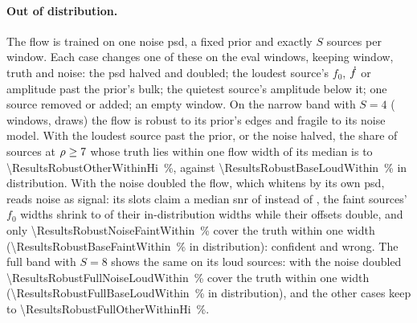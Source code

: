 \paragraph{Out of distribution.}
The flow is trained on one noise \ac{psd}, a fixed prior and exactly $S$ sources per window. Each case changes one of these
on the eval windows, keeping window, truth and noise: the \ac{psd} halved and doubled; the loudest source's $f_0$, $\dot f$
or amplitude past the prior's bulk; the quietest source's amplitude below it; one source removed or added; an empty window.
On the narrow band with $S=4$ (\ResultsRobustInjections{} windows, \ResultsRobustDraws{} draws) the flow is robust to its
prior's edges and fragile to its noise model. With the loudest source past the prior, or the noise halved, the share of
sources at $\rho\ge7$ whose truth lies within one flow width of its median is \ResultsRobustOtherWithinLo{} to
\qty{\ResultsRobustOtherWithinHi}{\percent}, against \qty{\ResultsRobustBaseLoudWithin}{\percent} in distribution. With the
noise doubled the flow, which whitens by its own \ac{psd}, reads noise as signal: its slots claim a median \ac{snr} of
\ResultsRobustNoiseSlotSnr{} instead of \ResultsRobustBaseSlotSnr, the faint sources' $f_0$ widths shrink to \ResultsRobustNoiseFaintWidth{} of their in-distribution widths while their offsets
double, and only \qty{\ResultsRobustNoiseFaintWithin}{\percent} cover the truth within one width
(\qty{\ResultsRobustBaseFaintWithin}{\percent}  in distribution): confident and wrong. The full band with $S=8$ shows the same on its loud sources: with the noise doubled
\qty{\ResultsRobustFullNoiseLoudWithin}{\percent} cover the truth within one width
(\qty{\ResultsRobustFullBaseLoudWithin}{\percent} in distribution), and the other cases keep
\ResultsRobustFullOtherWithinLo{} to \qty{\ResultsRobustFullOtherWithinHi}{\percent}.
